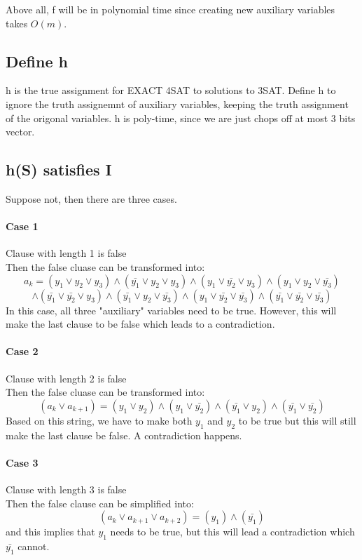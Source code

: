 \documentclass{article}
\begin{document}
Above all, f will be in polynomial time since creating new auxiliary variables takes $O(m)$.

\subsection*{Define h}
h is the true assignment for EXACT 4SAT to solutions to 3SAT. Define h to ignore the truth assignemnt 
of auxiliary variables, keeping the truth assignment of the origonal variables. h is poly-time,
since we are just chops off at most 3 bits vector.


\subsection*{h(S) satisfies I}
Suppose not, then there are three cases.
\paragraph*{Case 1} Clause with length 1 is false \\
Then the false cluase can be transformed into:
$$a_k = (y_1 \vee y_2 \vee y_3) \wedge (\bar{y_1} \vee y_2 \vee y_3) \wedge (y_1 \vee \bar{y_2} \vee y_3) \wedge (y_1 \vee y_2 \vee \bar{y_3})$$
$$\wedge (\bar{y_1} \vee \bar{y_2} \vee y_3) \wedge (\bar{y_1} \vee y_2 \vee \bar{y_3}) \wedge (y_1 \vee \bar{y_2} \vee \bar{y_3}) \wedge (\bar{y_1} \vee \bar{y_2} \vee \bar{y_3}) $$
In this case, all three "auxiliary" variables need to be true. However, this will make the last clause to be false which leads to a contradiction.

\paragraph*{Case 2} Clause with length 2 is false \\
Then the false cluase can be transformed into:
$$(a_k \vee a_{k+1}) = (y_1 \vee y_2) \wedge (y_1 \vee \bar{y_2}) \wedge (\bar{y_1} \vee y_2) \wedge (\bar{y_1} \vee \bar{y_2})$$
Based on this string, we have to make both $y_1$ and $y_2$ to be true but this will still make the last clause be false. A contradiction happens.


\paragraph*{Case 3} Clause with length 3 is false \\
Then the false clause can be simplified into:
$$(a_k \vee a_{k+1} \vee a_{k+2}) = (y_1) \wedge (\bar{y_1})$$
and this implies that $y_1$ needs to be true, but this will lead a contradiction which $\bar{y_1}$ cannot.
\end{document}
